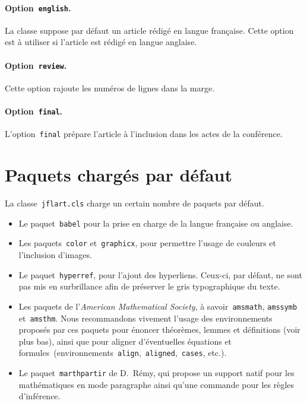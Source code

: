 \documentclass{jflart}
\begin{document}
\paragraph{Option~\texttt{english}.}

La classe suppose par défaut un article rédigé en langue française.
%
Cette option est à utiliser si l'article est rédigé en langue anglaise.

\paragraph{Option~\texttt{review}.}

Cette option rajoute les numéros de lignes dans la marge.

\paragraph{Option~\texttt{final}.}

L'option~\texttt{final} prépare l'article à l'inclusion dans les actes de la
conférence.

\section{Paquets chargés par défaut}

La classe~\texttt{jflart.cls} charge un certain nombre de paquets par défaut.
%
\begin{itemize}
\item
  Le paquet~\texttt{babel} pour la prise en charge de la langue française ou
  anglaise.

\item
  Les paquets~\texttt{color} et~\texttt{graphicx}, pour permettre l'usage de
  couleurs et l'inclusion d'images.

\item
  Le paquet~\texttt{hyperref}, pour l'ajout des hyperliens.
  Ceux-ci, par défaut, ne sont pas mis en surbrillance afin de préserver le gris
  typographique du texte.

\item
  Les paquets de l'\emph{American Mathematical Society}, à
  savoir~\texttt{amsmath}, \texttt{amssymb} et~\texttt{amsthm}.
  Nous recommandons vivement l'usage des environnements proposés par ces paquets
  pour énoncer théorèmes, lemmes et définitions (voir plus bas), ainsi que pour
  aligner d'éventuelles équations et
  formules~(environnements~\texttt{align},~\texttt{aligned},~\texttt{cases},
  etc.).

\item
  Le paquet~\texttt{marthpartir} de D.~Rémy, qui propose un support natif pour
  les mathématiques en mode paragraphe ainsi qu'une commande pour les règles
  d'inférence.

\end{itemize}
\end{document}
